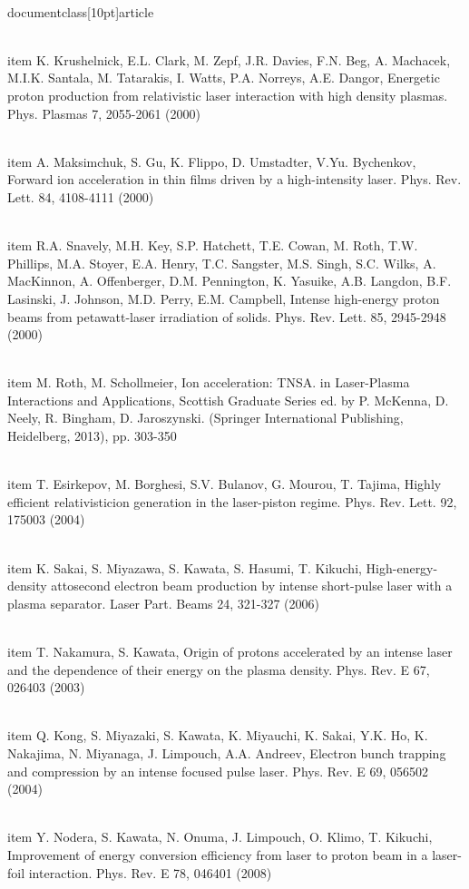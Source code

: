 \\documentclass[10pt]{article}
\begin{document}
{{{{{{  \\item K. Krushelnick, E.L. Clark, M. Zepf, J.R. Davies, F.N. Beg, A. Machacek, M.I.K. Santala, M. Tatarakis, I. Watts, P.A. Norreys, A.E. Dangor, Energetic proton production from relativistic laser interaction with high density plasmas. Phys. Plasmas 7, 2055-2061 (2000)

  \\item A. Maksimchuk, S. Gu, K. Flippo, D. Umstadter, V.Yu. Bychenkov, Forward ion acceleration in thin films driven by a high-intensity laser. Phys. Rev. Lett. 84, 4108-4111 (2000)

  \\item R.A. Snavely, M.H. Key, S.P. Hatchett, T.E. Cowan, M. Roth, T.W. Phillips, M.A. Stoyer, E.A. Henry, T.C. Sangster, M.S. Singh, S.C. Wilks, A. MacKinnon, A. Offenberger, D.M. Pennington, K. Yasuike, A.B. Langdon, B.F. Lasinski, J. Johnson, M.D. Perry, E.M. Campbell, Intense high-energy proton beams from petawatt-laser irradiation of solids. Phys. Rev. Lett. 85, 2945-2948 (2000)

  \\item M. Roth, M. Schollmeier, Ion acceleration: TNSA. in Laser-Plasma Interactions and Applications, Scottish Graduate Series ed. by P. McKenna, D. Neely, R. Bingham, D. Jaroszynski. (Springer International Publishing, Heidelberg, 2013), pp. 303-350

  \\item T. Esirkepov, M. Borghesi, S.V. Bulanov, G. Mourou, T. Tajima, Highly efficient relativisticion generation in the laser-piston regime. Phys. Rev. Lett. 92, 175003 (2004)

  \\item K. Sakai, S. Miyazawa, S. Kawata, S. Hasumi, T. Kikuchi, High-energy-density attosecond electron beam production by intense short-pulse laser with a plasma separator. Laser Part. Beams 24, 321-327 (2006)

  \\item T. Nakamura, S. Kawata, Origin of protons accelerated by an intense laser and the dependence of their energy on the plasma density. Phys. Rev. E 67, 026403 (2003)

  \\item Q. Kong, S. Miyazaki, S. Kawata, K. Miyauchi, K. Sakai, Y.K. Ho, K. Nakajima, N. Miyanaga, J. Limpouch, A.A. Andreev, Electron bunch trapping and compression by an intense focused pulse laser. Phys. Rev. E 69, 056502 (2004)

  \\item Y. Nodera, S. Kawata, N. Onuma, J. Limpouch, O. Klimo, T. Kikuchi, Improvement of energy conversion efficiency from laser to proton beam in a laser-foil interaction. Phys. Rev. E 78, 046401 (2008)

}}}}}}
\end{document}
